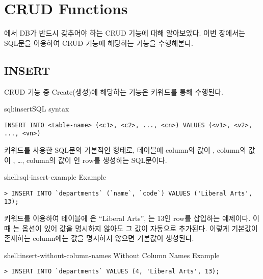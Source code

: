 \section{CRUD Functions}\label{sect:crud}

에서 DB가 반드시 갖추어야 하는 CRUD 기능에 대해 알아보았다. 이번 장에서는 SQL문을 이용하여 CRUD 기능에 해당하는 기능을 수행해본다.

\subsection*{INSERT}

CRUD 기능 중 Create(생성)에 해당하는 기능은  키워드를 통해 수행된다.

\begin{sql}{sql:insert}{SQL  syntax}
\begin{verbatim}
INSERT INTO <table-name> (<c1>, <c2>, ..., <cn>) VALUES (<v1>, <v2>, ..., <vn>)
\end{verbatim}
\end{sql}

\는  키워드를 사용한 SQL문의 기본적인 형태로,  테이블에  column의 값이 ,  column의 값이 , \ldots,  column의 값이 인 row를 생성하는 SQL문이다.

\begin{shell}{shell:sql-insert-example}{ Example}
\begin{verbatim}
> INSERT INTO `departments` (`name`, `code`) VALUES ('Liberal Arts', 13);
\end{verbatim}
\end{shell}

\은  키워드를 이용하여  테이블에 은 ``Liberal Arts'', 는 13인 row를 삽입하는 예제이다. 이때 는  옵션이 있어 값을 명시하지 않아도 그 값이 자동으로 추가된다. 이렇게 기본값이 존재하는 column에는 값을 명시하지 않으면 기본값이 생성된다.

\begin{shell}{shell:insert-without-column-names}{ Without Column Names Example}
\begin{verbatim}
> INSERT INTO `departments` VALUES (4, 'Liberal Arts', 13);
\end{verbatim}
\end{shell}

